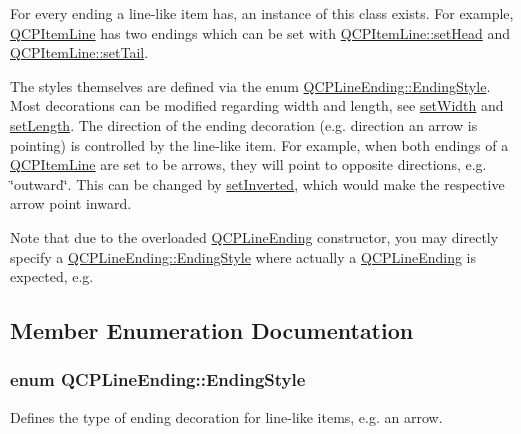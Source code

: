  \-For every ending a line-\/like item has, an instance of this class exists. \-For example, \hyperlink{classQCPItemLine}{\-Q\-C\-P\-Item\-Line} has two endings which can be set with \hyperlink{classQCPItemLine_aebf3d687114d584e0459db6759e2c3c3}{\-Q\-C\-P\-Item\-Line\-::set\-Head} and \hyperlink{classQCPItemLine_ac264222c3297a7efe33df9345c811a5f}{\-Q\-C\-P\-Item\-Line\-::set\-Tail}.

\-The styles themselves are defined via the enum \hyperlink{classQCPLineEnding_a5ef16e6876b4b74959c7261d8d4c2cd5}{\-Q\-C\-P\-Line\-Ending\-::\-Ending\-Style}. \-Most decorations can be modified regarding width and length, see \hyperlink{classQCPLineEnding_a26dc020ea985a72cc25881ce2115e34e}{set\-Width} and \hyperlink{classQCPLineEnding_ae36fa01763751cd64b7f56c3507e935a}{set\-Length}. \-The direction of the ending decoration (e.\-g. direction an arrow is pointing) is controlled by the line-\/like item. \-For example, when both endings of a \hyperlink{classQCPItemLine}{\-Q\-C\-P\-Item\-Line} are set to be arrows, they will point to opposite directions, e.\-g. \char`\"{}outward\char`\"{}. \-This can be changed by \hyperlink{classQCPLineEnding_a580e4e2360b35ebb8d68f3494aa2335d}{set\-Inverted}, which would make the respective arrow point inward.

\-Note that due to the overloaded \hyperlink{classQCPLineEnding}{\-Q\-C\-P\-Line\-Ending} constructor, you may directly specify a \hyperlink{classQCPLineEnding_a5ef16e6876b4b74959c7261d8d4c2cd5}{\-Q\-C\-P\-Line\-Ending\-::\-Ending\-Style} where actually a \hyperlink{classQCPLineEnding}{\-Q\-C\-P\-Line\-Ending} is expected, e.\-g. 
\begin{DoxyCodeInclude}
\end{DoxyCodeInclude}


\subsection{\-Member \-Enumeration \-Documentation}
\hypertarget{classQCPLineEnding_a5ef16e6876b4b74959c7261d8d4c2cd5}{
\subsubsection[{\-Ending\-Style}]{\setlength{\rightskip}{0pt plus 5cm}enum {\bf \-Q\-C\-P\-Line\-Ending\-::\-Ending\-Style}}}\label{classQCPLineEnding_a5ef16e6876b4b74959c7261d8d4c2cd5}
\-Defines the type of ending decoration for line-\/like items, e.\-g. an arrow.



